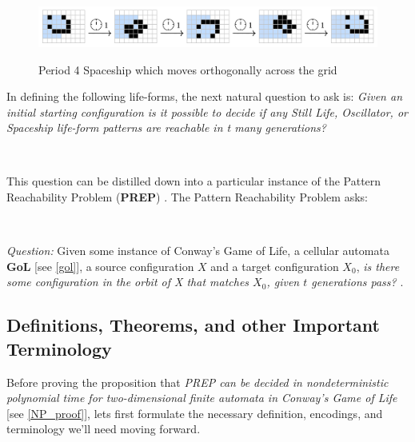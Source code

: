 \documentclass{article}
\theoremstyle{definition}
\theoremstyle{plain}
\theoremstyle{plain}
\begin{document}
 \begin{figure}[ht]
          \centering
    \includegraphics[width=15cm]{figures/figure_four.png}
    \caption{Period 4 Spaceship which moves orthogonally across the grid}
    \cite{JG2022conway}
    \label{spaceship_figure}
\end{figure}


In defining the following life-forms, the next natural question to ask is: \textit{Given an initial starting configuration is it possible to decide if any Still Life, Oscillator, or Spaceship life-form patterns are reachable in t many generations?}

\

This question can be distilled down into a particular instance of the Pattern Reachability Problem (\textbf{PREP}) \cite{SUTNER199587}. The Pattern Reachability Problem asks: 

 \

 \textit{Question: } Given some instance of Conway's Game of Life, a cellular automata \textbf{GoL} [see \ref{gol}], a source configuration $X$ and a target configuration \textbf{$X_0$}, \textit{is there some configuration in the orbit of X that matches $X_0$, given $t$ generations pass?} \cite{SUTNER199587}.

\subsection{Definitions, Theorems, and other Important Terminology}
Before proving the proposition that 
\textit {PREP can be decided in nondeterministic polynomial time for two-dimensional finite automata in Conway's Game of Life} [see \ref{NP_proof}], lets first formulate the necessary definition, encodings, and terminology we'll need moving forward.
\end{document}
